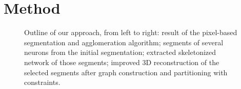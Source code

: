 \section{Method}

\begin{figure}[t!]
	\begin{center}
	\end{center}
	\caption{Outline of our approach, from left to right: result of the pixel-based segmentation and agglomeration algorithm; segments of several neurons from the initial segmentation; extracted skeletonized network of those segments; improved 3D reconstruction of the selected segments after graph construction and partitioning with constraints.}
	\label{fig:overview}
\end{figure}

